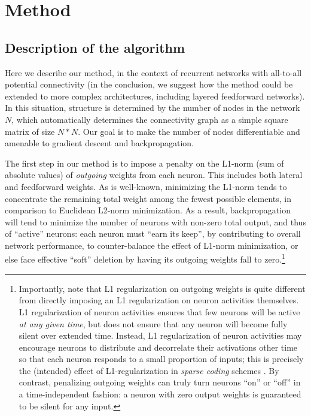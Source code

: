 \documentclass{article}
\begin{document}
\section{Method}

\subsection{Description of the algorithm}

Here we describe our method, in the context of recurrent networks with
all-to-all potential connectivity (in the conclusion, we suggest how the method
could be extended to more complex architectures, including layered feedforward
networks). In this situation, structure is determined by the number of nodes in
the network $N$, which automatically determines the connectivity graph as a
simple square matrix of size $N*N$. Our goal is to make the number of nodes
differentiable and amenable to gradient descent and backpropagation. 

The first step in our method is to impose a penalty on the L1-norm (sum of absolute values) of \textit{outgoing} weights from each neuron. This includes both lateral and feedforward weights.
As is well-known, minimizing the L1-norm 
tends to concentrate the remaining total weight among the fewest possible
elements, in comparison to Euclidean L2-norm minimization.  As a result,
backpropagation will tend to minimize the number of neurons with non-zero total output, and
thus of ``active'' neurons: each neuron must ``earn its keep'', by contributing
to overall network performance, to counter-balance the effect of L1-norm
minimization, or else face effective ``soft'' deletion by having its outgoing weights 
fall to zero.\footnote{Importantly, note that L1 regularization on outgoing weights is quite different from directly imposing an
    L1 regularization on neuron activities themselves. L1 regularization of
    neuron activities ensures that few neurons will be active \textit{at any
    given time}, but does not ensure that any neuron will become fully silent
    over extended time.  Instead, L1 regularization of neuron activities may
    encourage neurons to distribute and decorrelate their activations other
    time so that each neuron responds to a small proportion of inputs; this is
    precisely the (intended) effect of L1-regularization in \textit{sparse
coding} schemes \cite{Olshausen1996-vz}. By contrast, penalizing outgoing weights can truly
turn neurons ``on'' or ``off'' in a time-independent fashion: a neuron with 
zero output weights is guaranteed to be silent for any input. }
\end{document}

